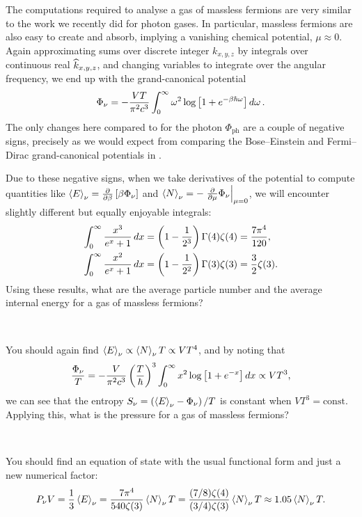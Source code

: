 The computations required to analyse a gas of massless fermions are very similar to the work we recently did for photon gases.
In particular, massless fermions are also easy to create and absorb, implying a vanishing chemical potential, $\mu \approx 0$.
Again approximating sums over discrete integer $k_{x, y, z}$ by integrals over continuous real $\widehat k_{x, y, z}$, and changing variables to integrate over the angular frequency, we end up with the grand-canonical potential
\begin{align}
  \Phi_{\nu} = -\frac{VT}{\pi^2 c^3} \int_0^{\infty} \omega^2 \log\left[1 + e^{-\beta \hbar \omega}\right] \mathop{d\omega}. \label{eq:neutrino_grand}
\end{align}
The only changes here compared to  for the photon $\Phi_{\text{ph}}$ are a couple of negative signs, precisely as we would expect from comparing the Bose--Einstein and Fermi--Dirac grand-canonical potentials in .

Due to these negative signs, when we take derivatives of the potential to compute quantities like $\left\langle E \right\rangle_{\nu} = \frac{\partial }{\partial \beta} \left[\beta \Phi_{\nu}\right]$ and $\left\langle N \right\rangle_{\nu} = -\left. \frac{\partial }{\partial \mu} \Phi_{\nu}\right|_{\mu = 0}$, we will encounter slightly different but equally enjoyable integrals: %
\begin{align*}
  \int_0^{\infty} \frac{x^3}{e^x + 1} \mathop{dx} & = \left(1 - \frac{1}{2^3}\right) \Gamma(4) \zeta(4) = \frac{7\pi^4}{120}, \\
  \int_0^{\infty} \frac{x^2}{e^x + 1} \mathop{dx} & = \left(1 - \frac{1}{2^2}\right) \Gamma(3) \zeta(3) = \frac{3}{2} \zeta(3).
\end{align*}
Using these results, what are the average particle number and the average internal energy for a gas of massless fermions?
\begin{mdframed}
  \ \\[110 pt]
\end{mdframed}

You should again find $\left\langle E \right\rangle_{\nu} \propto \left\langle N \right\rangle_{\nu} T \propto VT^4$, and by noting that
\begin{equation*}
  \frac{\Phi_{\nu}}{T} = -\frac{V}{\pi^2 c^3} \left(\frac{T}{\hbar}\right)^3 \int_0^{\infty} x^2 \log\left[1 + e^{-x}\right] \mathop{dx} \propto VT^3,
\end{equation*}
we can see that the entropy $S_{\nu} = \left(\left\langle E \right\rangle_{\nu} - \Phi_{\nu}\right) / T$ is constant when $V T^3 = \mbox{const}$.
Applying this, what is the pressure for a gas of massless fermions?
\begin{mdframed}
  \ \\[100 pt]
\end{mdframed}
You should find an equation of state with the usual functional form and just a new numerical factor:
\begin{equation*}
  P_{\nu} V = \frac{1}{3} \left\langle E \right\rangle_{\nu} = \frac{7\pi^4}{540\zeta(3)} \left\langle N \right\rangle_{\nu} T = \frac{(7/8)\zeta(4)}{(3/4)\zeta(3)} \left\langle N \right\rangle_{\nu} T \approx 1.05 \left\langle N \right\rangle_{\nu} T.
\end{equation*}



